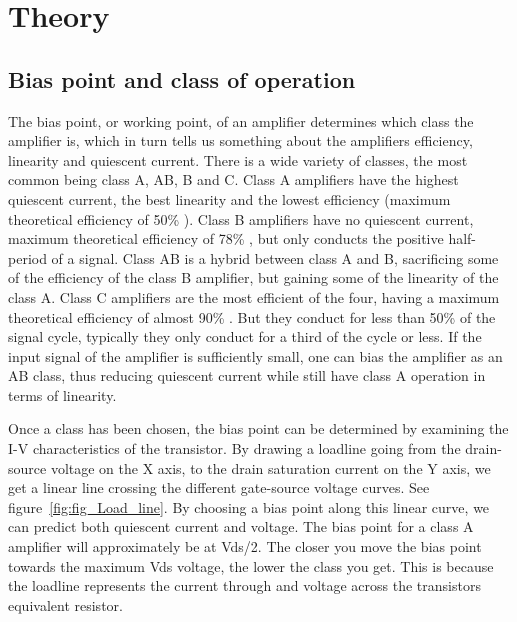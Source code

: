 \chapter{Theory}

\section{Bias point and class of operation}
The bias point, or working point, of an amplifier determines which class the amplifier is, which in turn tells us something about the amplifiers efficiency, linearity and quiescent current. There is a wide variety of classes, the most common being class A, AB, B and C. 
Class A amplifiers have the highest quiescent current, the best linearity and the lowest efficiency (maximum theoretical efficiency of 50\% ). 
Class B amplifiers have no quiescent current, maximum theoretical efficiency of 78\% , but only conducts the positive half-period of a signal. 
Class AB is a hybrid between class A and B, sacrificing some of the efficiency of the class B amplifier, but gaining some of the linearity of the class A. 
Class C amplifiers are the most efficient of the four, having a maximum theoretical efficiency of almost 90\% . But they conduct for less than 50\%  of the signal cycle, typically they only conduct for a third of the cycle or less.
If the input signal of the amplifier is sufficiently small, one can bias the amplifier as an AB class, thus reducing quiescent current while still have class A operation in terms of linearity.

Once a class has been chosen, the bias point can be determined by examining the I-V characteristics of the transistor. By drawing a loadline going from the drain-source voltage on the X axis, to the drain saturation current on the Y axis, we get a linear line crossing the different gate-source voltage curves. See figure~\ref{fig:fig_Load_line}. By choosing a bias point along this linear curve, we can predict both quiescent current and voltage. The bias point for a class A amplifier will approximately be at Vds/2. The closer you move the bias point towards the maximum Vds voltage, the lower the class you get. This is because the loadline represents the current through and voltage across the transistors equivalent resistor.

